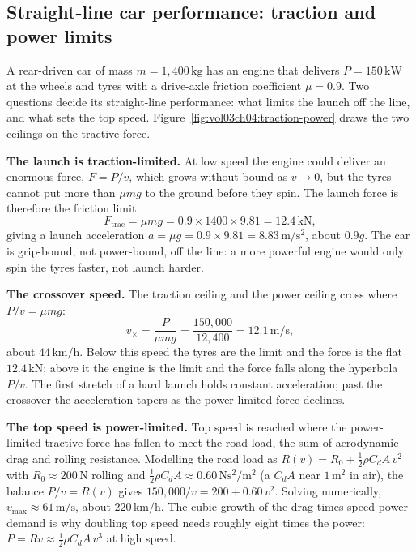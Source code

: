 

\subsection{Straight-line car performance: traction and power limits}

A rear-driven car of mass $m=1{,}400\,\si{\kilogram}$ has an engine
that delivers $P=150\,\si{\kilo\watt}$ at the wheels and tyres with a
drive-axle friction coefficient $\mu=0.9$. Two questions decide its
straight-line performance: what limits the launch off the line, and
what sets the top speed. Figure~\ref{fig:vol03ch04:traction-power}
draws the two ceilings on the tractive force.

\textbf{The launch is traction-limited.} At low speed the engine could
deliver an enormous force, $F=P/v$, which grows without bound as
$v\to 0$, but the tyres cannot put more than $\mu m g$ to the ground
before they spin. The launch force is therefore the friction limit
\[
F_{\text{trac}}=\mu m g=0.9\times 1400\times 9.81=12.4\,\si{\kilo
\newton},
\]
giving a launch acceleration $a=\mu g=0.9\times 9.81=8.83\,\si{\meter
\per\second\squared}$, about $0.9g$. The car is grip-bound, not
power-bound, off the line: a more powerful engine would only spin the
tyres faster, not launch harder.

\textbf{The crossover speed.} The traction ceiling and the power
ceiling cross where $P/v=\mu m g$:
\[
v_{\times}=\frac{P}{\mu m g}=\frac{150{,}000}{12{,}400}=12.1\,\si{
\meter\per\second},
\]
about $44\,\si{\kilo\meter\per\hour}$. Below this speed the tyres are
the limit and the force is the flat $12.4\,\si{\kilo\newton}$; above it
the engine is the limit and the force falls along the hyperbola $P/v$.
The first stretch of a hard launch holds constant acceleration; past
the crossover the acceleration tapers as the power-limited force
declines.

\textbf{The top speed is power-limited.} Top speed is reached where the
power-limited tractive force has fallen to meet the road load, the sum
of aerodynamic drag and rolling resistance. Modelling the road load as
$R(v)=R_{0}+\tfrac{1}{2}\rho C_{d}A\,v^{2}$ with $R_{0}\approx
200\,\si{\newton}$ rolling and $\tfrac{1}{2}\rho C_{d}A\approx
0.60\,\si{\newton\second\squared\per\meter\squared}$ (a $C_{d}A$ near
$1\,\si{\meter\squared}$ in air), the balance $P/v=R(v)$ gives
$150{,}000/v=200+0.60\,v^{2}$. Solving numerically, $v_{\max}\approx
61\,\si{\meter\per\second}$, about $220\,\si{\kilo\meter\per\hour}$. The
cubic growth of the drag-times-speed power demand is why doubling top
speed needs roughly eight times the power: $P=R v\approx
\tfrac{1}{2}\rho C_{d}A\,v^{3}$ at high speed.

